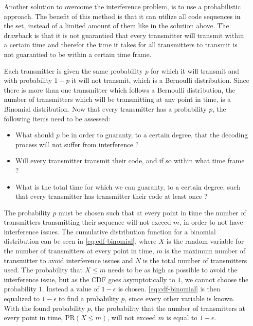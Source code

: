 Another solution to overcome the interference problem, is to use a probabilistic approach.
The benefit of this method is that it can utilize all code sequences in the set, instead of a limited amount of them like in the solution above.
The drawback is that it is not guarantied that every transmitter will transmit within a certain time and therefor the time it takes for all transmitters to transmit is not guarantied to be within a certain time frame.


Each transmitter is given the same probability $p$ for which it will transmit and with probability $1 - p$ it will not transmit, which is a Bernoulli distribution.
Since there is more than one transmitter which follows a Bernoulli distribution, the number of transmitters which will be transmitting at any point in time, is a Binomial distribution.
Now that every transmitter has a probability $p$, the following items need to be assessed:

\begin{itemize}
	\item What should $p$ be in order to guaranty, to a certain degree, that the decoding process will not suffer from interference ?
	\item Will every transmitter transmit their code, and if so within what time frame ?
	\item What is the total time for which we can guaranty, to a certain degree, such that every transmitter has transmitter their code at least once ? 
\end{itemize}



The probability $p$ must be chosen such that at every point in time the number of transmitters transmitting their sequence will not exceed $m$, in order to not have interference issues.
The cumulative distribution function for a binomial distribution can be seen in \autoref{eq:cdf-binomial}, where $X$ is the random variable for the number of transmitters at every point in time, $m$ is the maximum number of transmitter to avoid interference issues and $N$ is the total number of transmitters used.
The probability that $X \le m$ needs to be as high as possible to avoid the interference issue, but as the CDF goes asymptotically to $1$, we cannot choose the probability $1$.
Instead a value of $1 - \epsilon$ is chosen.
\autoref{eq:cdf-binomial} is then equalized to $1 - \epsilon$ to find a probability $p$, since every other variable is known.
With the found probability $p$, the probability that the number of transmitters at every point in time, PR$(X \le m)$, will not exceed $m$ is equal to $1 - \epsilon$.

